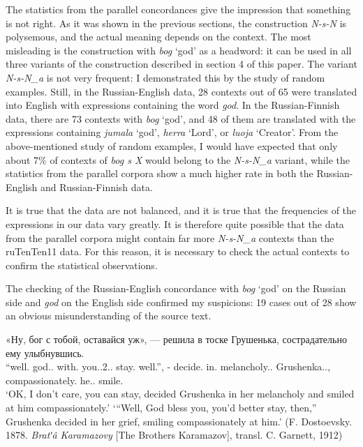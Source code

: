 \documentclass[output=paper]{langscibook}
\begin{document}
The statistics from the parallel concordances give the impression that something is not right. As it was shown in the previous sections, the construction \textit{N-s-N} is polysemous, and the actual meaning depends on the context. The most misleading is the construction with \textit{bog} ‘god’ as a headword: it can be used in all three variants of the construction described in section 4 of this paper. The variant \textit{N-s-N\_a} is not very frequent: I demonstrated this by the study of random examples. Still, in the Russian-English data, 28 contexts out of 65 were translated into English with expressions containing the word \textit{god}. In the Russian-Finnish data, there are 73 contexts with \textit{bog} ‘god’, and 48 of them are translated with the expressions containing \textit{jumala} ‘god’, \textit{herra} ‘Lord’, or \textit{luoja} ‘Creator’. From the above-mentioned study of random examples, I would have expected that only about 7\% of contexts of \textit{bog s X} would belong to the \textit{N-s-N\_a} variant, while the statistics from the parallel corpora show a much higher rate in both the Russian-English and Russian-Finnish data.

It is true that the data are not balanced, and it is true that the frequencies of the expressions in our data vary greatly. It is therefore quite possible that the data from the parallel corpora might contain far more \textit{N-s-N\_a} contexts than the ruTenTen11 data. For this reason, it is necessary to check the actual contexts to confirm the statistical observations.

The checking of the Russian-English concordance with \textit{bog} ‘god’ on the Russian side and \textit{god} on the English side confirmed my suspicions: 19 cases out of 28 show an obvious misunderstanding of the source text.

\ea \label{ex:mikhailov:12}
\gll «Ну, бог с тобой, оставайся уж», — решила в тоске Грушенька, сострадательно ему улыбнувшись.\\
     “well.{\PTCP} god.{\NOUN}.{\NOM} with.{\PREP} you.{\PRON}.2.{\INSTR}.{\SG} stay.{\IMP} well.{\PTCP}”, - decide.{\PAST}{\F}{\SG} in.{\PREP} melancholy.{\NOUN}.{\LOC}{\SG} Grushenka.{\NOUNPROPER}.{\NOM}, compassionately.{\ADV} he.{\PRON}.{\DAT}{\SG} smile.{\GERUND}\\
\glt `OK, I don’t care, you can stay, decided Grushenka in her melancholy and smiled at him compassionately.'
\glt `“Well, God bless you, you’d better stay, then,” Grushenka decided in her grief, smiling compassionately at him.' (F. Dostoevsky. 1878. \textit{Bratʹâ Karamazovy} [The Brothers Karamazov], transl. C. Garnett, 1912)\z
\end{document}
